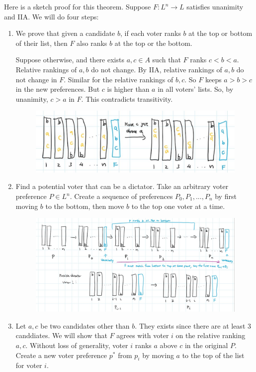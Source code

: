 \documentclass[twoside]{article}
\begin{document}
	Here is a sketch proof for this theorem. Suppose $F: L^n \rightarrow L$ satisfies unanimity and IIA. We will do four steps:
	\begin{enumerate}
		\item We prove that given a candidate $b$, if each voter ranks $b$ at the top or bottom of their list, then $F$ also ranks $b$ at the top or the bottom. 
		      	
		      Suppose otherwise, and there exists $a, c \in A$ such that $F$ ranks $c < b < a$. Relative rankings of $a, b$ do not change. By IIA, relative rankings of $a, b$ do not change in $F$. Similar for the relative rankings of $b, c$. So $F$ keeps $a > b > c$ in the new preferences. But $c$ is higher than $a$ in all voters' lists. So, by unanimity, $c > a$ in $F$. This contradicts transitivity. 
		      	
		      \begin{center}
		      	\begin{figure}[h!]
		      		\includegraphics[width=\textwidth]{voting_1.png}
		      	\end{figure}
		      \end{center}
		\item Find a potential voter that can be a dictator. Take an arbitrary voter preference $P \in L^n$. Create a sequence of preferences $P_0, P_1, ..., P_n$ by first moving $b$ to the bottom, then move $b$ to the top one voter at a time. 
		      \newpage
		      \begin{center}
		      	\begin{figure}[h!]
		      		\includegraphics[width=\textwidth]{voting_2.png}
		      	\end{figure}
		      \end{center}
		\item Let $a, c$ be two candidates other than $b$. They exists since there are at least 3 canddiates. We will show that $F$ agrees with voter $i$ on the relative ranking $a, c$. Without loss of generality, voter $i$ ranks $a$ above $c$ in the original $P$. Create a new voter preference $p^*$ from $p_i$ by moving $a$ to the top of the list for voter $i$. 
		      

\end{enumerate}
\end{document}
